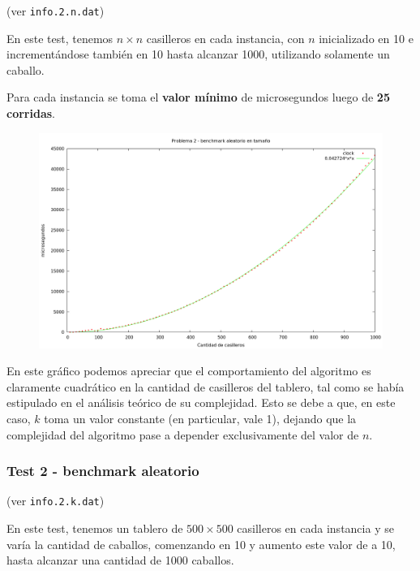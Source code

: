 (ver \verb|info.2.n.dat|) \medskip

En este test, tenemos $n \times n$ casilleros en cada instancia, con $n$
inicializado en 10 e incrementándose también en 10 hasta alcanzar 1000,
utilizando solamente un caballo.

Para cada instancia se toma el \textbf{valor mínimo} de microsegundos luego de
\textbf{25 corridas}.

\vspace*{0.5cm}

\begin{figure}[h]
  \begin{center}
    \includegraphics[scale=0.35]{imagenes/grafico-2-n.png}
  \end{center}
\end{figure}

\vspace*{0.5cm}

En este gráfico podemos apreciar que el comportamiento del algoritmo es
claramente cuadrático en la cantidad de casilleros del tablero, tal como se
había estipulado en el análisis teórico de su complejidad. Esto se debe a que,
en este caso, $k$ toma un valor constante (en particular, vale 1), dejando que
la complejidad del algoritmo pase a depender exclusivamente del valor de $n$.


\newpage
\subsubsection{Test 2 - benchmark aleatorio}

(ver \verb|info.2.k.dat|) \medskip

En este test, tenemos un tablero de $500 \times 500$ casilleros en cada
instancia y se varía la cantidad de caballos, comenzando en 10 y aumento este
valor de a 10, hasta alcanzar una cantidad de 1000 caballos.

